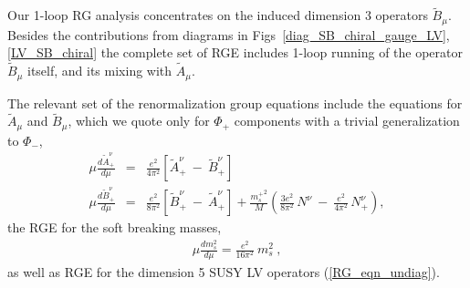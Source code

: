 \documentclass[12pt]{revtex4}
\begin{document}

Our 1-loop RG analysis concentrates on the induced dimension 3 operators $ \widetilde{B}_\mu $.
	Besides the contributions from diagrams
	in Figs~\ref{diag_SB_chiral_gauge_LV}, \ref{LV_SB_chiral} the 
complete set of RGE includes
	1-loop running of the operator $ \widetilde{B}_\mu $ itself, and its mixing with 
$ \widetilde{A}_\mu $.

The relevant set of the renormalization group equations include the equations for 
$\widetilde{A}_\mu$ and $\widetilde{B}_\mu$, which we quote only for $\Phi_+$ components
with a trivial generalization to $\Phi_-$,
\begin{eqnarray}
\label{RG_AB}
\nonumber
        \mu\frac{d \widetilde{A}_+^\nu}
                 {d\mu}               & = &
        \frac{e^2}{4\pi^2}  \left [    \widetilde{A}_+^\nu  ~-~ \widetilde{B}_+^\nu  \right ]
        \\
        \mu\frac{d \widetilde{B}_+^\nu}
                 {d\mu}               & = &
        \frac{e^2}{8\pi^2}  \left [    \widetilde{B}_+^\nu  ~-~ \widetilde{A}_+^\nu  \right ] 
        +
        \frac{{m_s^+}^2}{M}
        \left (
                \frac{3e^2}
                    {8\pi^2}\, N^\nu 
                ~-~
                \frac{e^2}
                    {4\pi^2}\, N_+^\nu 
        \right ),
       \end{eqnarray}
         the RGE for the soft breaking masses, 
\begin{eqnarray}
       \mu \frac{d m_s^2}
               {d\mu}             =
        \frac{e^2}{16\pi^2}~ m_s^2~,
\end{eqnarray}
as well as RGE for the dimension 5 SUSY LV operators (\ref{RG_eqn_undiag}).	
\end{document}

